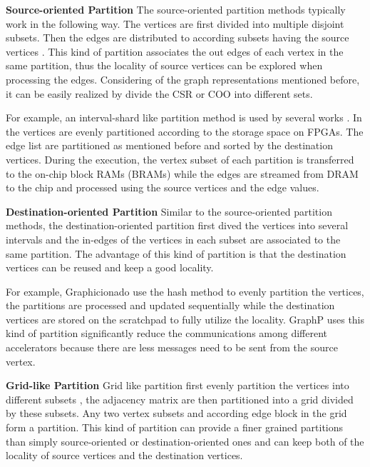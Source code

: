 \documentclass[twoside]{article}
\begin{document}
\begin{multicols}{2}
\vspace{1mm}

\textbf{Source-oriented Partition}\quad 
The source-oriented partition methods typically work in the following way. The vertices are first divided into multiple disjoint subsets. Then the edges are distributed to according subsets having the source vertices \cite{zhou2016highthroughput,yao2018pact}. This kind of partition associates the out edges of each vertex in the same partition, thus the locality of source vertices can be explored when processing the edges. Considering of the graph representations mentioned before, it can be easily realized by divide the CSR or COO into different sets. 

For example, an interval-shard like partition method is used by several works \cite{zhou2016highthroughput,zhou2017cpufpga}. In \cite{zhou2016highthroughput} the vertices are evenly partitioned according to the storage space on FPGAs. The edge list are partitioned as mentioned before and sorted by the destination vertices. During the execution, the vertex subset of each partition is transferred to the on-chip block RAMs (BRAMs) while the edges are streamed from DRAM to the chip and processed using the source vertices and the edge values. 


{\bf Destination-oriented Partition}\quad 
Similar to the source-oriented partition methods, the destination-oriented partition \cite{Dai2016fpgp,ham2016graphicionado} first dived the vertices into several intervals and the in-edges of the vertices in each subset are associated to the same partition. The advantage of this kind of partition is that the destination vertices can be reused and keep a good locality.

For example, Graphicionado \cite{ham2016graphicionado} use the hash method to evenly partition the vertices, the partitions are processed and updated sequentially while the destination vertices are stored on the scratchpad to fully utilize the locality. GraphP \cite{zhang2018graphp} uses this kind of partition significantly reduce the communications among different accelerators because there are less messages need to be sent from the source vertex.

{\bf Grid-like Partition}\quad
Grid like partition first evenly partition the vertices into different subsets \cite{Dai2017foregraph,song2018graphr}, the adjacency matrix are then partitioned into a grid divided by these subsets. Any two vertex subsets and according edge block in the grid form a partition. This kind of partition can provide a finer grained partitions than simply source-oriented or destination-oriented ones and can keep both of the locality of source vertices and the destination vertices. 


\end{multicols}
\end{document}

